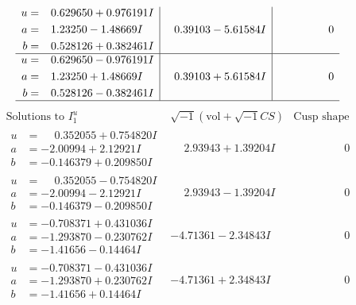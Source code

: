 \documentclass[1p]{elsarticle_modified}
\theoremstyle{definition}
\newcommand{\I}{\sqrt{-1}}
\begin{document}
$$\begin{array}{c|c|c}
\begin{aligned}
u &= \phantom{-}0.629650 + 0.976191 I \\
a &= \phantom{-}1.23250 - 1.48669 I \\
b &= \phantom{-}0.528126 + 0.382461 I\end{aligned}
 & \phantom{-}0.39103 - 5.61584 I & \phantom{-0.000000 } 0 \\ \hline\begin{aligned}
u &= \phantom{-}0.629650 - 0.976191 I \\
a &= \phantom{-}1.23250 + 1.48669 I \\
b &= \phantom{-}0.528126 - 0.382461 I\end{aligned}
 & \phantom{-}0.39103 + 5.61584 I & \phantom{-0.000000 } 0\\
 \hline 
 \end{array}$$\newpage$$\begin{array}{c|c|c}  
\text{Solutions to }I^u_{1}& \I (\text{vol} + \sqrt{-1}CS) & \text{Cusp shape}\\
 \hline 
\begin{aligned}
u &= \phantom{-}0.352055 + 0.754820 I \\
a &= -2.00994 + 2.12921 I \\
b &= -0.146379 + 0.209850 I\end{aligned}
 & \phantom{-}2.93943 + 1.39204 I & \phantom{-0.000000 } 0 \\ \hline\begin{aligned}
u &= \phantom{-}0.352055 - 0.754820 I \\
a &= -2.00994 - 2.12921 I \\
b &= -0.146379 - 0.209850 I\end{aligned}
 & \phantom{-}2.93943 - 1.39204 I & \phantom{-0.000000 } 0 \\ \hline\begin{aligned}
u &= -0.708371 + 0.431036 I \\
a &= -1.293870 - 0.230762 I \\
b &= -1.41656 - 0.14464 I\end{aligned}
 & -4.71361 - 2.34843 I & \phantom{-0.000000 } 0 \\ \hline\begin{aligned}
u &= -0.708371 - 0.431036 I \\
a &= -1.293870 + 0.230762 I \\
b &= -1.41656 + 0.14464 I\end{aligned}
 & -4.71361 + 2.34843 I & \phantom{-0.000000 } 0 \\ \hline\begin{aligned}

\end{aligned}
\end{array}$$
\end{document}
